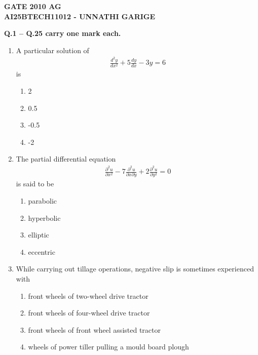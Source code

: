 \documentclass[journal]{IEEEtran}
\numberwithin{equation}{enumi}
\numberwithin{figure}{enumi}
\begin{document}



\begin{center}
    \LARGE \textbf{GATE 2010 AG}\\[0.5em]
    \large \textbf{AI25BTECH11012 - UNNATHI GARIGE}
\end{center}

\textbf{Q.1 -- Q.25 carry one mark each.}
\bigskip
\begin{enumerate}


\item A particular solution of 
    \begin{align*}
      \frac{d^2 y}{dx^2} + 5 \frac{dy}{dx} - 3y = 6  
    \end{align*} is
    \hfill{}
\begin{multicols}{4}
\begin{enumerate}
    \item 2
    \item 0.5
    \item -0.5
    \item -2
\end{enumerate}
\end{multicols}


    \item The partial differential equation 
    \begin{align*}
    \frac{\partial^2 u}{\partial x^2} - 7 \frac{\partial^2 u}{\partial x \partial y} + 2 \frac{\partial^2 u}{\partial y^2} = 0
    \end{align*}
    is said to be
       \hfill{}
\begin{multicols}{4}
\begin{enumerate}
    \item parabolic
    \item hyperbolic
    \item elliptic
    \item eccentric
\end{enumerate}
\end{multicols}


    \item While carrying out tillage operations, negative slip is sometimes experienced with
    \begin{enumerate}
    \item  front wheels of two-wheel drive tractor \hfill{}
    \item  front wheels of four-wheel drive tractor 
    \item  front wheels of front wheel assisted tractor 
    \item  wheels of power tiller pulling a mould board plough
    \end{enumerate}



\end{enumerate}
\end{document}
